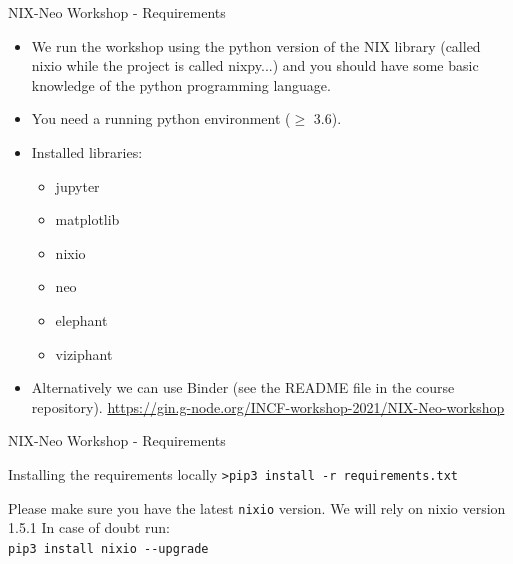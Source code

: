 \documentclass[pdftex]{beamer}
\begin{document}
\begin{frame}{NIX-Neo Workshop - Requirements}
    \begin{itemize}
        \item We run the workshop using the python version of the NIX library (called nixio while the project is called nixpy...) and you should have some basic knowledge of the python programming language.
        \item You need a running python environment ($\geq$ 3.6).
        \item Installed libraries:
        \begin{itemize}
            \item jupyter
            \item matplotlib
            \item nixio
            \item neo
            \item elephant
            \item viziphant
        \end{itemize}
    \item Alternatively we can use Binder (see the README file in the course repository). \url{https://gin.g-node.org/INCF-workshop-2021/NIX-Neo-workshop}
    \end{itemize}
\end{frame}


\begin{frame}[fragile]{NIX-Neo Workshop - Requirements}
    \begin{block}{Installing the requirements locally}
    \verb+>pip3 install -r requirements.txt+
    \end{block}
    \pause
    \vspace{2cm}
    \begin{alertblock}{Please make sure you have the latest \texttt{nixio} version.}
        We will rely on nixio version 1.5.1 In case of doubt run:\\
        \verb+pip3 install nixio --upgrade+
    \end{alertblock}

\end{frame}
\end{document}
